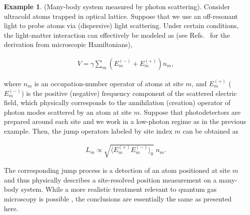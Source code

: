 \documentclass{tADP2e}
\theoremstyle{plain}
\newcommand{\eqn}[1]{
\begin{eqnarray}
	#1
\end{eqnarray}
}
\theoremstyle{plain}
\theoremstyle{definition}
\newtheorem{example}{Example}[section]
\newcommand{\exmp}[1]{
\begin{example}
	#1
\end{example}
}
\begin{document}
\exmp{\label{qgmexmp}(Many-body system measured by photon scattering). 
Consider ultracold atoms trapped in optical lattice. Suppose that we use an off-resonant light to probe atoms  via (dispersive) light scattering. Under certain conditions, the light-matter interaction can effectively be modeled as (see Refs.~\cite{JJ95,YA15} for the derivation from microscopic Hamiltonians),
\eqn{V=\gamma\sum_{m}\left( {E}_{m}^{(-)}+ {E}_{m}^{(+)}\right)n_{m},}
where $n_m$ is an occupation-number operator of atoms at site $m$, and ${E}_{m}^{(+)}$ (${E}_{m}^{(-)}$) is the positive (negative) frequency component of the scattered electric field, which physically corresponds to the annihilation (creation) operator of photon modes scattered by an atom at site $m$. Suppose that photodetectors are prepared around each site and we work in a low-photon regime as in the previous example. Then, the jump operators labeled by site index $m$ can be obtained as 
\eqn{ {L}_{m}\propto\sqrt{\langle {E}_{m}^{(+)} {E}_{m}^{(-)}\rangle_{0}}\; {n}_{m}.
}
The corresponding jump process is a detection of an atom positioned at site $m$ and thus physically describes a site-resolved position measurement on a  many-body system.
While a more realistic treatment relevant to quantum gas microscopy \cite{BWS09} is possible \cite{YA15}, the conclusions are essentially the same as presented here.
}

\vspace{5pt}

\end{document}
